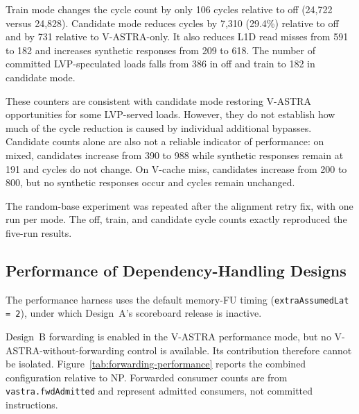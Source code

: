 Train mode changes the cycle count by only 106 cycles relative to
off (24,722 versus 24,828). Candidate mode reduces cycles by 7,310
(29.4\%) relative to off and by 731 relative to V-ASTRA-only. It
also reduces L1D read misses from 591 to 182 and increases synthetic
responses from 209 to 618. The number of committed LVP-speculated
loads falls from 386 in off and train to 182 in candidate mode.

These counters are consistent with candidate mode restoring
V-ASTRA opportunities for some LVP-served loads. However, they do
not establish how much of the cycle reduction is caused by individual
additional bypasses. Candidate counts alone are also not a reliable
indicator of performance: on mixed, candidates increase from
390 to 988 while synthetic responses remain at 191 and cycles do not
change. On V-cache miss, candidates increase from 200 to 800, but
no synthetic responses occur and cycles remain unchanged.

The random-base experiment was repeated after the alignment retry
fix, with one run per mode. The off, train, and candidate cycle counts
exactly reproduced the five-run results.

\subsection{Performance of Dependency-Handling Designs}
\label{subsec:dependency-performance}

The performance harness uses the default memory-FU timing
(\texttt{extraAssumedLat = 2}), under which Design~A's scoreboard
release is inactive.

Design~B forwarding is enabled in the V-ASTRA performance mode, but
no V-ASTRA-without-forwarding control is available. Its contribution
therefore cannot be isolated. Figure~\ref{tab:forwarding-performance}
reports the combined configuration relative to NP. Forwarded
consumer counts are from \texttt{vastra.fwdAdmitted} and represent
admitted consumers, not committed instructions.

